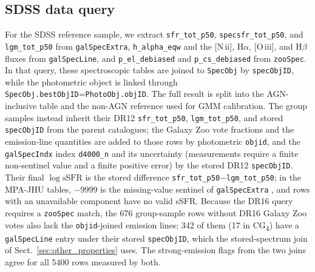 \documentclass{aa}
\newcommand{\CG}{CG\textsubscript{4}}
\begin{document}
\setlength{\textfloatsep}{12pt plus 2pt minus 3pt}
\setlength{\dbltextfloatsep}{12pt plus 2pt minus 3pt}
\begin{appendix}

\section{SDSS data query}\label{app:sdss_query}

For the SDSS reference sample, we extract \texttt{sfr\_tot\_p50}, \texttt{specsfr\_tot\_p50}, and \texttt{lgm\_tot\_p50} from \texttt{galSpecExtra}, \texttt{h\_alpha\_eqw} and the [N\,{\sc ii}], H\(\alpha\), [O\,{\sc iii}], and H\(\beta\) fluxes from \texttt{galSpecLine}, and \texttt{p\_el\_debiased} and \texttt{p\_cs\_debiased} from \texttt{zooSpec}. In that query, these spectroscopic tables are joined to \texttt{SpecObj} by \texttt{specObjID}, while the photometric object is linked through \texttt{SpecObj.bestObjID}=\texttt{PhotoObj.objID}. The full result is split into the AGN-inclusive table and the non-AGN reference used for GMM calibration. The group samples instead inherit their DR12 \texttt{sfr\_tot\_p50}, \texttt{lgm\_tot\_p50}, and stored \texttt{specObjID} from the parent catalogues; the Galaxy Zoo vote fractions and the emission-line quantities are added to those rows by photometric \texttt{objid}, and the \texttt{galSpecIndx} index \texttt{d4000\_n} and its uncertainty (measurements require a finite non-sentinel value and a finite positive error) by the stored DR12 \texttt{specObjID}. Their final \(\log\mathrm{sSFR}\) is the stored difference \texttt{sfr\_tot\_p50}\(-\)\texttt{lgm\_tot\_p50}; in the MPA-JHU tables, \(-9999\) is the missing-value sentinel of \texttt{galSpecExtra} \citep{Stoughton02}, and rows with an unavailable component have no valid sSFR. Because the DR16 query requires a \texttt{zooSpec} match, the 676 group-sample rows without DR16 Galaxy Zoo votes also lack the \texttt{objid}-joined emission lines; 342 of them (17 in \CG{}) have a \texttt{galSpecLine} entry under their stored \texttt{specObjID}, which the stored-spectrum join of Sect.~\ref{sec:other_properties} uses. The strong-emission flags from the two joins agree for all 5400 rows measured by both.






\end{appendix}
\end{document}
